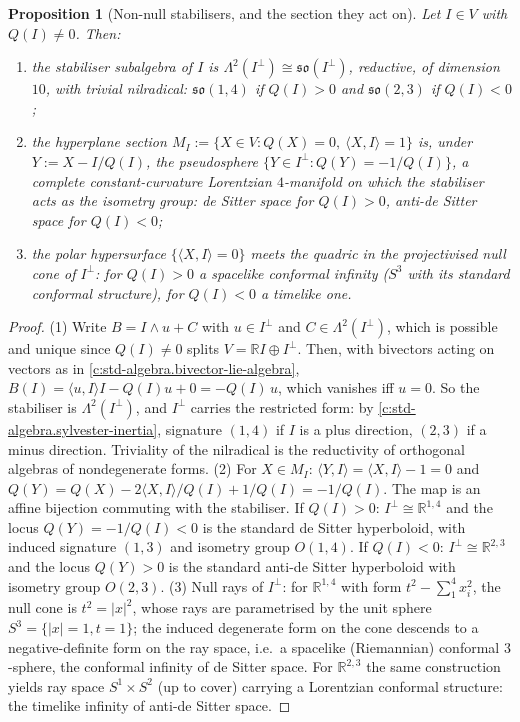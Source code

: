 \documentclass[11pt]{article}
\newtheorem{proposition}[theorem]{Proposition}
\theoremstyle{definition}
\theoremstyle{plain}
\newcommand{\changedmark}[2]{\marginpar{\raggedright\scriptsize\color{#1}#2}}
\providecommand{\R}{}\renewcommand{\R}{\mathbb{R}}
\providecommand{\ip}{}\renewcommand{\ip}[2]{\langle #1, #2\rangle}
\begin{document}
\begin{proposition}[Non-null stabilisers, and the section they act on]\label{c:interior.non-null-stabilisers-section-they-act}
\changedmark{gray}{reworded}
Let $I \in V$ with $Q(I) \neq 0$. Then:
\begin{enumerate}
\item the stabiliser subalgebra of $I$ is $\Lambda^2(I^\perp) \cong \mathfrak{so}(I^\perp)$, reductive, of dimension $10$, with trivial nilradical: $\mathfrak{so}(1,4)$ if $Q(I) > 0$ and $\mathfrak{so}(2,3)$ if $Q(I) < 0$;
\item the hyperplane section $M_I := \{X \in V : Q(X) = 0,\ \ip{X}{I} = 1\}$ is, under $Y := X - I/Q(I)$, the pseudosphere $\{Y \in I^\perp : Q(Y) = -1/Q(I)\}$, a complete constant-curvature Lorentzian $4$-manifold on which the stabiliser acts as the isometry group: de Sitter space for $Q(I) > 0$, anti-de Sitter space for $Q(I) < 0$;
\item the polar hypersurface $\{\ip{X}{I} = 0\}$ meets the quadric in the projectivised null cone of $I^\perp$: for $Q(I) > 0$ a spacelike conformal infinity ($S^3$ with its standard conformal structure), for $Q(I) < 0$ a timelike one.
\end{enumerate}
\end{proposition}
\begin{proof}
(1) Write $B = I \wedge u + C$ with $u \in I^\perp$ and $C \in \Lambda^2(I^\perp)$, which is possible and unique since $Q(I) \neq 0$ splits $V = \R I \oplus I^\perp$. Then, with bivectors acting on vectors as in \ref{c:std-algebra.bivector-lie-algebra}, $B(I) = \ip{u}{I}I - Q(I)u + 0 = -Q(I)\,u$, which vanishes iff $u = 0$. So the stabiliser is $\Lambda^2(I^\perp)$, and $I^\perp$ carries the restricted form: by \ref{c:std-algebra.sylvester-inertia}, signature $(1,4)$ if $I$ is a plus direction, $(2,3)$ if a minus direction. Triviality of the nilradical is the reductivity of orthogonal algebras of nondegenerate forms. (2) For $X \in M_I$: $\ip{Y}{I} = \ip{X}{I} - 1 = 0$ and $Q(Y) = Q(X) - 2\ip{X}{I}/Q(I) + 1/Q(I) = -1/Q(I)$. The map is an affine bijection commuting with the stabiliser. If $Q(I) > 0$: $I^\perp \cong \R^{1,4}$ and the locus $Q(Y) = -1/Q(I) < 0$ is the standard de Sitter hyperboloid, with induced signature $(1,3)$ and isometry group $O(1,4)$. If $Q(I) < 0$: $I^\perp \cong \R^{2,3}$ and the locus $Q(Y) > 0$ is the standard anti-de Sitter hyperboloid with isometry group $O(2,3)$. (3) Null rays of $I^\perp$: for $\R^{1,4}$ with form $t^2 - \sum_1^4 x_i^2$, the null cone is $t^2 = |x|^2$, whose rays are parametrised by the unit sphere $S^3 = \{|x| = 1, t = 1\}$; the induced degenerate form on the cone descends to a negative-definite form on the ray space, i.e.\ a spacelike (Riemannian) conformal $3$-sphere, the conformal infinity of de Sitter space. For $\R^{2,3}$ the same construction yields ray space $S^1 \times S^2$ (up to cover) carrying a Lorentzian conformal structure: the timelike infinity of anti-de Sitter space.

\end{proof}
\end{document}
